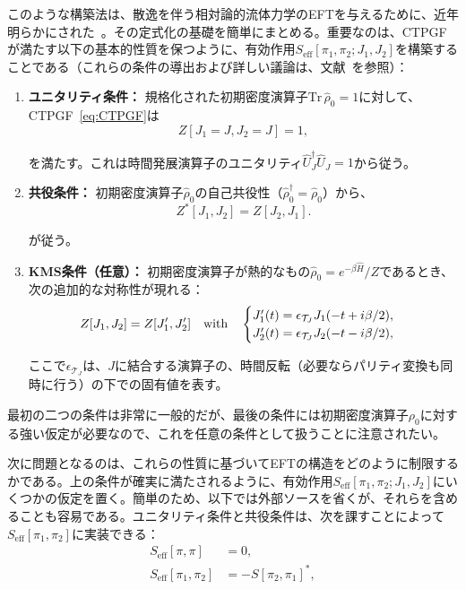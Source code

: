 \medskip
このような構築法は、散逸を伴う相対論的流体力学のEFTを与えるために、近年明らかにされた~\cite{Crossley:2015evo,Glorioso:2017fpd}。その定式化の基礎を簡単にまとめる。重要なのは、CTPGFが満たす以下の基本的性質を保つように、有効作用$S_{\mathrm{eff}} [\pi_1,\pi_2;J_1,J_2]$を構築することである（これらの条件の導出および詳しい議論は、文献~\cite{Crossley:2015evo,Glorioso:2017fpd}を参照）：
\begin{enumerate}
 \item \textbf{ユニタリティ条件：}
       規格化された初期密度演算子$\mathrm{Tr}\,\hat{\rho}_0 = 1$に対して、CTPGF~\eqref{eq:CTPGF}は
\begin{equation}
	Z[J_1 = J ,J_2 = J] = 1 ,
       \end{equation}

を満たす。これは時間発展演算子のユニタリティ$\hat{U}_{J}^\dagger\hat{U}_{J}=1$から従う。
 \item \textbf{共役条件：}
       初期密度演算子$\hat{\rho}_{0}$の自己共役性（$\hat{\rho}_0^\dag = \hat{\rho}_0$）から、
\begin{equation}
	Z^* [J_1, J_2] = Z[J_2, J_1] .
       \end{equation}

が従う。
 \item \textbf{KMS条件（任意）：}
       初期密度演算子が熱的なもの$\hat{\rho}_0 = e^{-\beta \hat{H}}/Z$であるとき、次の追加的な対称性が現れる：
\begin{equation}
       \label{eq_KMS}
	Z [J_1,J_2 ] =  Z [J_1', J_2'] {\quad\mathrm{with}}\quad 
	 \begin{cases}
	  J_1'(t) = \epsilon_{\mathcal{T}_J} J_1 (-t + i \beta /2) , \\
	  J_2'(t) = \epsilon_{\mathcal{T}_J} J_2 (-t - i\beta/2) ,
	 \end{cases}
       \end{equation}

ここで$\epsilon_{\mathcal{T}_J}$は、$J$に結合する演算子の、時間反転（必要ならパリティ変換も同時に行う）の下での固有値を表す。
\end{enumerate}
最初の二つの条件は非常に一般的だが、最後の条件には初期密度演算子$\rho_0$に対する強い仮定が必要なので、これを任意の条件として扱うことに注意されたい。

\medskip
次に問題となるのは、これらの性質に基づいてEFTの構造をどのように制限するかである。上の条件が確実に満たされるように、有効作用$S_{\mathrm{eff}} [\pi_1,\pi_2;J_1,J_2]$にいくつかの仮定を置く。簡単のため、以下では外部ソースを省くが、それらを含めることも容易である。ユニタリティ条件と共役条件は、次を課すことによって$S_{\mathrm{eff}} [\pi_1,\pi_2]$に実装できる：
\begin{align}
 S_{\mathrm{eff}} [\pi,\pi] &=0 ,\label{+-unitary:action}
 \\
 S_{\mathrm{eff}} [\pi_1,\pi_2]& = -S[\pi_2,\pi_1]^*,
\label{+-unitarity:2}
\end{align}

